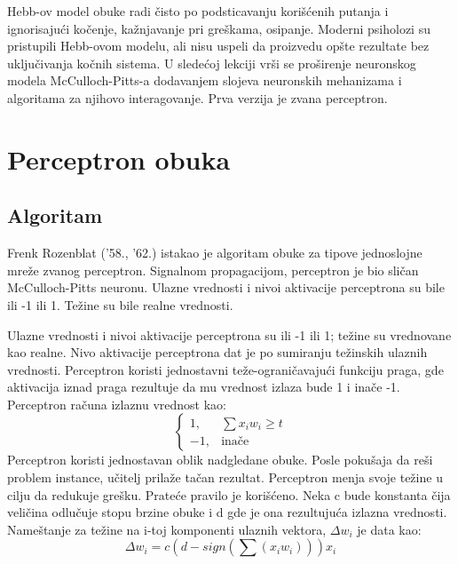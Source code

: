 \documentclass[fontsize=11bp, paper=a4]{scrarticle}
\begin{document}
Hebb-ov model obuke radi čisto po podsticavanju korišćenih putanja i ignorisajući kočenje, kažnjavanje pri greškama, osipanje. Moderni psiholozi su pristupili Hebb-ovom modelu, ali nisu uspeli da proizvedu opšte rezultate bez uključivanja kočnih sistema. U sledećoj lekciji vrši se proširenje neuronskog modela McCulloch-Pitts-a dodavanjem slojeva neuronskih mehanizama i algoritama za njihovo interagovanje. Prva verzija je zvana perceptron.

\section{Perceptron obuka}
\subsection{Algoritam}

Frenk Rozenblat ('58., '62.) istakao je algoritam obuke za tipove jednoslojne mreže zvanog perceptron. Signalnom propagacijom, perceptron je bio sličan McCulloch-Pitts neuronu. Ulazne vrednosti i nivoi aktivacije perceptrona su bile ili -1 ili 1. Težine su bile realne vrednosti. 

Ulazne vrednosti i nivoi aktivacije perceptrona su ili -1 ili 1; težine su vrednovane kao realne. Nivo aktivacije perceptrona dat je po sumiranju težinskih ulaznih vrednosti. Perceptron koristi jednostavni teže-ograničavajući funkciju praga, gde aktivacija iznad praga rezultuje da mu vrednost izlaza bude 1 i inače -1. Perceptron računa izlaznu vrednost kao:
$$
\begin{cases}
    1, & \sum {x_i w_i} \ge t\\
    -1,& \text{inače}
\end{cases}
$$
Perceptron koristi jednostavan oblik nadgledane obuke. Posle pokušaja da reši problem instance, učitelj prilaže tačan rezultat. Perceptron menja svoje težine u cilju da redukuje grešku. Prateće pravilo je korišćeno. Neka c bude konstanta čija veličina odlučuje stopu brzine obuke i d gde je ona rezultujuća izlazna vrednosti. Nameštanje za težine na i-toj komponenti ulaznih vektora, $\Delta w_i$ je data kao: 
$$
\Delta w_i = c(d - sign(\sum (x_i w_i))) x_i
$$
\end{document}
